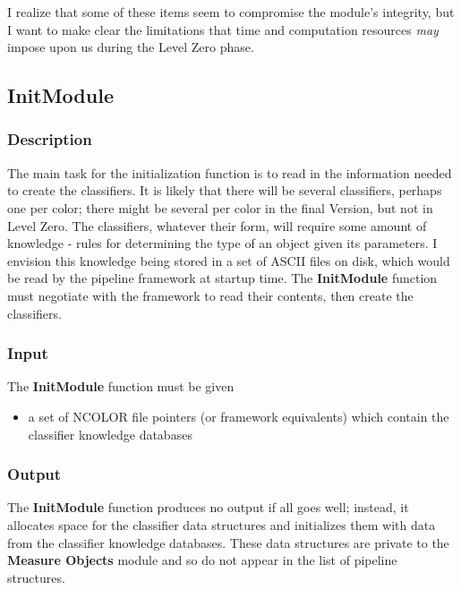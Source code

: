   I realize that some of these items seem to compromise the module's
integrity, but I want to make clear the limitations that time and
computation resources {\it may} impose upon us during the Level Zero phase.

\subsection {InitModule}

\subsubsection {Description}

  The main task for the initialization function is to read in the
information needed to create the classifiers.  It is likely that
there will be several classifiers, perhaps one per color; there might
be several per color in the final Version, but not in Level Zero.
The classifiers, whatever their form, will require some amount of
knowledge - rules for determining the type of an object given its
parameters.  I envision this knowledge being stored in a set of 
ASCII files on disk, which would be read by the pipeline framework
at startup time.  The {\bf InitModule} function must 
negotiate with the framework to read their contents, 
then create the classifiers.

\subsubsection {Input}

  The {\bf InitModule} function must be given

\begin {itemize}
    \item a set of NCOLOR file pointers (or framework equivalents)
          which contain the classifier knowledge databases
\end {itemize}

\subsubsection {Output}

  The {\bf InitModule} function produces no output if all 
goes well; instead, it allocates space for the classifier
data structures and initializes them with data from the 
classifier knowledge databases.  These data structures are
private to the {\bf Measure Objects} module and so do not appear
in the list of pipeline structures.

